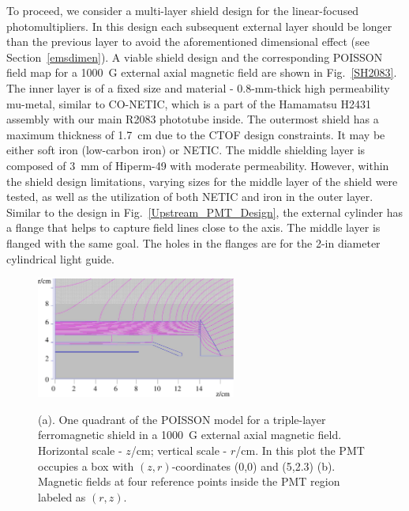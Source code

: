 \documentclass[12pt]{article}
\begin{document}
To proceed, we consider a multi-layer shield design for the linear-focused 
photomultipliers. In this design each subsequent external layer should be longer 
than the previous layer to avoid the aforementioned dimensional effect (see 
Section~\ref{emsdimen}). A viable shield design and the corresponding POISSON field 
map for a 1000~G external axial magnetic field are shown in Fig.~\ref{SH2083}. The 
inner layer is of a fixed size and material - 0.8-mm-thick high permeability mu-metal, 
similar to CO-NETIC, which is a part of the Hamamatsu H2431 assembly with our main 
R2083 phototube inside. The outermost shield has a maximum thickness of 1.7~cm due to 
the CTOF design constraints. It may be either soft iron (low-carbon iron) or NETIC. 
The middle shielding layer is composed of 3~mm of Hiperm-49 with moderate permeability. 
However, within the shield design limitations, varying sizes for the middle layer of 
the shield were tested, as well as the utilization of both NETIC and iron in the 
outer layer. Similar to the design in Fig.~\ref{Upstream_PMT_Design}, the external 
cylinder has a flange that helps to capture field lines close to the axis. The middle 
layer is flanged with the same goal. The holes in the flanges are for the 2-in
diameter cylindrical light guide.
  
\begin{figure}[ht]
\centering
\subfloat[]
{\includegraphics[height=4cm,clip=true,bb=0 60 1150 750]{R2083_NETIC_hiperm49_CONETIC_standardDesign.eps}
\label{SH2083}}
\qquad
{}
\qquad
\caption{(a). One quadrant of the POISSON model for a triple-layer ferromagnetic shield 
in a 1000~G external axial magnetic field. Horizontal scale - $z$/cm; vertical scale - 
$r$/cm. In this plot the PMT occupies a box with $(z,r)$-coordinates (0,0) and (5,2.3)
(b). Magnetic fields at four reference points inside the PMT region labeled as 
$(r,z)$.}
\label{R2083_Initial_Iron}
\end{figure}
\end{document}
